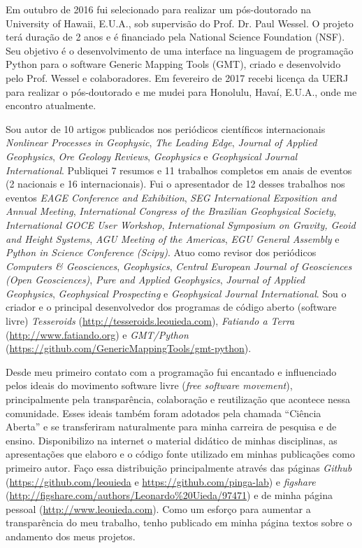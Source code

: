 Em outubro de 2016 fui selecionado para realizar um pós-doutorado na University
of Hawaii, E.U.A., sob supervisão do Prof. Dr. Paul Wessel.
O projeto terá duração de 2 anos e é financiado pela National Science
Foundation (NSF).
Seu objetivo é o desenvolvimento de uma interface na linguagem de programação
Python para o software Generic Mapping Tools (GMT), criado e desenvolvido pelo
Prof. Wessel e colaboradores.
Em fevereiro de 2017 recebi licença da UERJ para realizar o pós-doutorado e me
mudei para Honolulu, Havaí, E.U.A., onde me encontro atualmente.

Sou autor de 10 artigos publicados nos periódicos científicos internacionais
{\em Nonlinear Processes in Geophysic},
{\em The Leading Edge},
{\em Journal of Applied Geophysics},
{\em Ore Geology Reviews},
{\em Geophysics} e
{\em Geophysical Journal International}.
Publiquei 7 resumos e 11 trabalhos completos em anais de eventos (2 nacionais e
16 internacionais).
Fui o apresentador de 12 desses trabalhos nos eventos
{\em EAGE Conference and Exhibition},
{\em SEG International Exposition and Annual Meeting},
{\em International Congress of the Brazilian Geophysical Society},
{\em International GOCE User Workshop},
{\em International Symposium on Gravity, Geoid and Height Systems},
{\em AGU Meeting of the Americas},
{\em EGU General Assembly} e
{\em Python in Science Conference (Scipy)}.
Atuo como revisor dos periódicos
{\em Computers \& Geosciences},
{\em Geophysics},
{\em Central European Journal of Geosciences (Open Geosciences)},
{\em Pure and Applied Geophysics},
{\em Journal of Applied Geophysics},
{\em Geophysical Prospecting}
e {\em Geophysical Journal International}.
Sou o criador e o principal desenvolvedor dos programas de código aberto
(software livre)
{\em Tesseroids} (\url{http://tesseroids.leouieda.com}),
{\em Fatiando a Terra} (\url{http://www.fatiando.org}) e
{\em GMT/Python} (\url{https://github.com/GenericMappingTools/gmt-python}).

Desde meu primeiro contato com a programação fui encantado e influenciado pelos
ideais do movimento software livre ({\em free software movement}),
principalmente pela transparência, colaboração e reutilização que acontece
nessa comunidade.
Esses ideais também foram adotados pela chamada ``Ciência Aberta'' e se
transferiram naturalmente para minha carreira de pesquisa e de ensino.
Disponibilizo na internet o material didático de minhas disciplinas, as
apresentações que elaboro e o código fonte utilizado em minhas publicações como
primeiro autor.
Faço essa distribuição principalmente através das páginas
{\em Github} (\url{https://github.com/leouieda} e
\url{https://github.com/pinga-lab}) e
{\em figshare} (\url{http://figshare.com/authors/Leonardo%20Uieda/97471})
e de minha página pessoal (\url{http://www.leouieda.com}).
Como um esforço para aumentar a transparência do meu trabalho, tenho publicado
em minha página textos sobre o andamento dos meus projetos.


